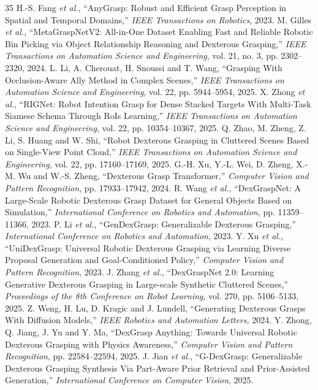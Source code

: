 \documentclass[lettersize,journal]{IEEEtran}
\begin{document}
\begin{thebibliography}{35}
 H.-S. Fang \emph{et al.}, ``AnyGrasp: Robust and Efficient Grasp Perception in Spatial and Temporal Domains,'' \emph{IEEE Transactions on Robotics}, 2023.
 M. Gilles \emph{et al.}, ``MetaGraspNetV2: All-in-One Dataset Enabling Fast and Reliable Robotic Bin Picking via Object Relationship Reasoning and Dexterous Grasping,'' \emph{IEEE Transactions on Automation Science and Engineering}, vol. 21, no. 3, pp. 2302--2320, 2024.
 L. Li, A. Cherouat, H. Snoussi and T. Wang, ``Grasping With Occlusion-Aware Ally Method in Complex Scenes,'' \emph{IEEE Transactions on Automation Science and Engineering}, vol. 22, pp. 5944--5954, 2025.
 X. Zhong \emph{et al.}, ``RIGNet: Robot Intention Grasp for Dense Stacked Targets With Multi-Task Siamese Schema Through RoIs Learning,'' \emph{IEEE Transactions on Automation Science and Engineering}, vol. 22, pp. 10354--10367, 2025.
 Q. Zhao, M. Zheng, Z. Li, S. Huang and W. Shi, ``Robot Dexterous Grasping in Cluttered Scenes Based on Single-View Point Cloud,'' \emph{IEEE Transactions on Automation Science and Engineering}, vol. 22, pp. 17160--17169, 2025.
 G.-H. Xu, Y.-L. Wei, D. Zheng, X.-M. Wu and W.-S. Zheng, ``Dexterous Grasp Transformer,'' \emph{Computer Vision and Pattern Recognition}, pp. 17933--17942, 2024.
 R. Wang \emph{et al.}, ``DexGraspNet: A Large-Scale Robotic Dexterous Grasp Dataset for General Objects Based on Simulation,'' \emph{International Conference on Robotics and Automation}, pp. 11359--11366, 2023.
 P. Li \emph{et al.}, ``GenDexGrasp: Generalizable Dexterous Grasping,'' \emph{International Conference on Robotics and Automation}, 2023.
 Y. Xu \emph{et al.}, ``UniDexGrasp: Universal Robotic Dexterous Grasping via Learning Diverse Proposal Generation and Goal-Conditioned Policy,'' \emph{Computer Vision and Pattern Recognition}, 2023.
 J. Zhang \emph{et al.}, ``DexGraspNet 2.0: Learning Generative Dexterous Grasping in Large-scale Synthetic Cluttered Scenes,'' \emph{Proceedings of the 8th Conference on Robot Learning}, vol. 270, pp. 5106--5133, 2025.
 Z. Weng, H. Lu, D. Kragic and J. Lundell, ``Generating Dexterous Grasps With Diffusion Models,'' \emph{IEEE Robotics and Automation Letters}, 2024.
 Y. Zhong, Q. Jiang, J. Yu and Y. Ma, ``DexGrasp Anything: Towards Universal Robotic Dexterous Grasping with Physics Awareness,'' \emph{Computer Vision and Pattern Recognition}, pp. 22584--22594, 2025.
 J. Jian \emph{et al.}, ``G-DexGrasp: Generalizable Dexterous Grasping Synthesis Via Part-Aware Prior Retrieval and Prior-Assisted Generation,'' \emph{International Conference on Computer Vision}, 2025.

\end{thebibliography}
\end{document}
